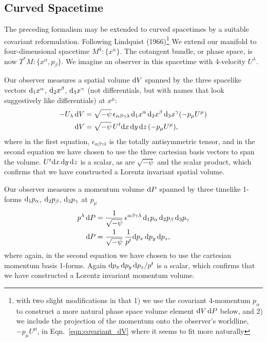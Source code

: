 \subsection{Curved Spacetime}
The preceding formalism may be extended to curved spacetimes by a suitable
covariant reformulation. Following Lindquist (1966)\footnote{with two slight
modifications in that 1) we use the covariant 4-momentum $p_\alpha$ to construct
a more natural phase space volume element $\mathrm{d} V\,\mathrm{d} P$ below, and 2) we
include the projection of the momentum onto the observer's worldline,
$-p_\mu U^\mu$, in Eqn.~\ref{eqn:covariant_dV} where it seems to fit more
naturally}
We extend our manifold to four-dimensional spacetime
$M^4:\{x^\alpha\}$. The cotangent bundle, or phase space, is now
$T^*M:\{x^\alpha,p_\beta\}$.
We imagine an observer in this spacetime with 4-velocity $U^\lambda$.

Our observer measures a spatial
volume $\mathrm{d} V$ spanned by the three spacelike vectors
$\mathrm{d}_1x^\alpha$, $\mathrm{d}_2x^\beta$, $\mathrm{d}_3x^\gamma$
(not differentials, but with names that look suggestively like differentials)
at $x^\mu$:
\begin{align}
  \label{eqn:covariant_dV}
  -U_\lambda\,\mathrm{d} V &= \sqrt{-\psi} \, \epsilon_{\alpha\beta\gamma\lambda}\,
  \mathrm{d}_1x^\alpha\, \mathrm{d}_2x^\beta\, \mathrm{d}_3x^\gamma (-p_\mu U^\mu) \\
  \label{eqn:dV}
  \mathrm{d} V       &= \sqrt{-\psi} \, U^t \mathrm{d} x\,\mathrm{d} y\,\mathrm{d} z\, (-p_\mu U^\mu),
\end{align}
where in the first equation, $\epsilon_{\alpha\beta\gamma\lambda}$ is the
totally antisymmetric tensor, and in the second equation we have
chosen to use the three cartesian basis vectors to span the volume.
$U^t \mathrm{d} x\,\mathrm{d} y\,\mathrm{d} z$ is a scalar,
as are $\sqrt{-\psi}$ and the scalar product, which confirms that we have
constructed a Lorentz invariant spatial volume.

Our observer
measures a momentum volume $\mathrm{d} P$ spanned by three timelike 1-forms
$\mathrm{d}_1p_\alpha$, $\mathrm{d}_2p_\beta$, $\mathrm{d}_3p_\gamma$ at $p_\mu$
\begin{align}
  \label{eqn:covariant_dP}
  p^\lambda\, \mathrm{d} P &= \frac{1}{\sqrt{-\psi}} \, \epsilon^{\alpha\beta\gamma\lambda}\,
  \mathrm{d}_1p_\alpha\, \mathrm{d}_2p_\beta\, \mathrm{d}_3p_\gamma \\
  \label{eqn:dP}
  \mathrm{d} P &= \frac{1}{\sqrt{-\psi}} \, \frac{1}{p^t} \mathrm{d} p_x\, \mathrm{d} p_y\, \mathrm{d} p_z,
\end{align}
where again, in the second equation we have chosen to use the cartesian momentum
basis 1-forms.
Again $\mathrm{d} p_x\, \mathrm{d} p_y\, \mathrm{d} p_z/p^t$ is a scalar,
which confirms that we have
constructed a Lorentz invariant momentum volume.

